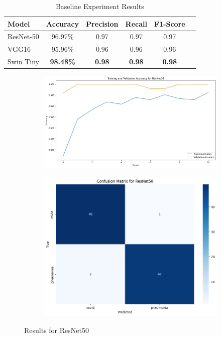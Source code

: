 \documentclass[12pt, a4paper]{article}
\begin{document}
\begin{table}[h]
    \centering
    \begin{tabular}{lccccc}
        \toprule
        Model & Accuracy & Precision & Recall & F1-Score \\
        \midrule
        ResNet-50 & 96.97\% & 0.97 & 0.97 & 0.97 \\
        VGG16 & 95.96\% & 0.96 & 0.96 & 0.96 \\
        Swin Tiny & \textbf{98.48\%} & \textbf{0.98} & \textbf{0.98} & \textbf{0.98} \\
        \bottomrule
    \end{tabular}
    \caption{Baseline Experiment Results}
    \label{tab:baseline}
\end{table}


\begin{figure}[htbp]
  \centering
  \begin{subfigure}[b]{0.8\textwidth}
    \centering
    \includegraphics[width=\textwidth]{img/resnet_acc.png} %
    \label{fig:resnet_acc}
\end{subfigure}
  \hfill
  \begin{subfigure}[b]{0.8\textwidth}
    \centering
    \includegraphics[width=\linewidth]{img/resnet_conf.png}
    \label{fig:resnet_conf}
  \end{subfigure}
\caption{Results for ResNet50}
\end{figure}
\end{document}
